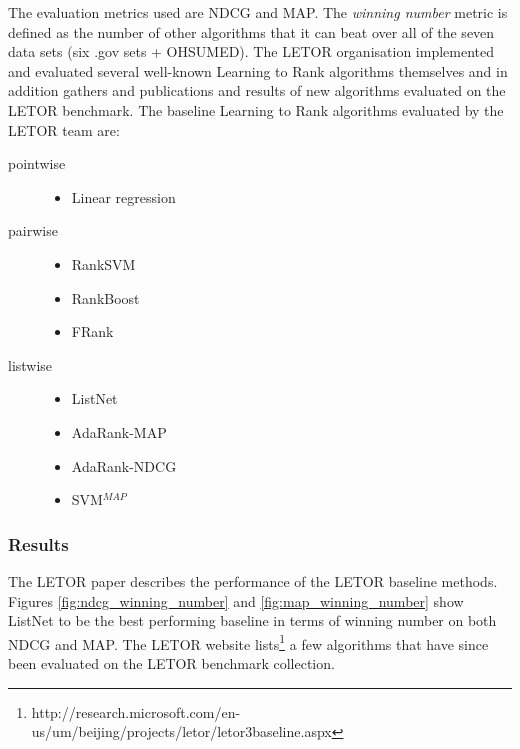 The evaluation metrics used are \ac{NDCG} and \ac{MAP}. The \emph{winning number} metric is defined as the number of other algorithms that it can beat over all of the seven data sets (six .gov sets + OHSUMED). The LETOR organisation implemented and evaluated several well-known Learning to Rank algorithms themselves and in addition gathers and publications and results of new algorithms evaluated on the LETOR benchmark. The baseline Learning to Rank algorithms evaluated by the LETOR team are:
\begin{description}
\item[pointwise]{\leavevmode
	\begin{itemize}
	\item Linear regression
	\end{itemize}}
\item[pairwise]{\leavevmode
	\begin{itemize}
	\item Rank\ac{SVM} \cite{Herbrich1999,Joachims2002}
	\item RankBoost \cite{Freund2003}
	\item FRank \cite{Tsai2007}
	\end{itemize}}
\item[listwise]{\leavevmode
	\begin{itemize}
	\item ListNet \cite{Cao2007}
	\item AdaRank-MAP \cite{Xu2007}
	\item AdaRank-NDCG \cite{Xu2007}
	\item \ac{SVM}$^{MAP}$ \cite{Yue2007} 
	\end{itemize}}
\end{description} 

\subsubsection{Results}
The LETOR paper \cite{Qin2010} describes the performance of the LETOR baseline methods. Figures \ref{fig:ndcg_winning_number} and \ref{fig:map_winning_number} show ListNet to be the best performing baseline in terms of winning number on both \ac{NDCG} and \ac{MAP}. The LETOR website lists\footnote{http://research.microsoft.com/en-us/um/beijing/projects/letor/letor3baseline.aspx} a few algorithms that have since been evaluated on the LETOR benchmark collection.\\

